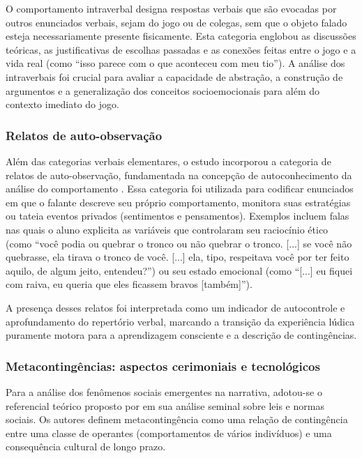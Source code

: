 \documentclass[portuguese]{textolivre}
\begin{document}
O comportamento intraverbal designa respostas verbais que são evocadas por outros enunciados verbais, sejam do jogo ou de colegas, sem que o objeto falado esteja necessariamente presente fisicamente. Esta categoria englobou as discussões teóricas, as justificativas de escolhas passadas e as conexões feitas entre o jogo e a vida real (como “isso parece com o que aconteceu com meu tio”). A análise dos intraverbais foi crucial para avaliar a capacidade de abstração, a construção de argumentos e a generalização dos conceitos socioemocionais para além do contexto imediato do jogo.

\subsubsection{Relatos de auto-observação}

Além das categorias verbais elementares, o estudo incorporou a categoria de relatos de auto-observação, fundamentada na concepção de autoconhecimento da análise do comportamento \cite{skinner1974behaviorismo,baum2019compreender}. Essa categoria foi utilizada para codificar enunciados em que o falante descreve seu próprio comportamento, monitora suas estratégias ou tateia eventos privados (sentimentos e pensamentos). Exemplos incluem falas nas quais o aluno explicita as variáveis que controlaram seu raciocínio ético (como “você podia ou quebrar o tronco ou não quebrar o tronco. [...] se você não quebrasse, ela tirava o tronco de você. [...] ela, tipo, respeitava você por ter feito aquilo, de algum jeito, entendeu?”) ou seu estado emocional (como “[...] eu fiquei com raiva, eu queria que eles ficassem bravos [também]”).

A presença desses relatos foi interpretada como um indicador de autocontrole e aprofundamento do repertório verbal, marcando a transição da experiência lúdica puramente motora para a aprendizagem consciente e a descrição de contingências.

\subsubsection{Metacontingências: aspectos cerimoniais e tecnológicos}

Para a análise dos fenômenos sociais emergentes na narrativa, adotou-se o referencial teórico proposto por \textcite{todorov2004analise} em sua análise seminal sobre leis e normas sociais. Os autores definem metacontingência como uma relação de contingência entre uma classe de operantes (comportamentos de vários indivíduos) e uma consequência cultural de longo prazo.
\end{document}
